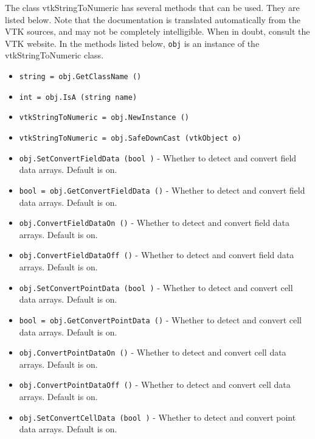The class vtkStringToNumeric has several methods that can be used.
  They are listed below.
Note that the documentation is translated automatically from the VTK sources,
and may not be completely intelligible.  When in doubt, consult the VTK website.
In the methods listed below, \verb|obj| is an instance of the vtkStringToNumeric class.
\begin{itemize}
\item  \verb|string = obj.GetClassName ()|

\item  \verb|int = obj.IsA (string name)|

\item  \verb|vtkStringToNumeric = obj.NewInstance ()|

\item  \verb|vtkStringToNumeric = obj.SafeDownCast (vtkObject o)|

\item  \verb|obj.SetConvertFieldData (bool )| -  Whether to detect and convert field data arrays.  Default is on.

\item  \verb|bool = obj.GetConvertFieldData ()| -  Whether to detect and convert field data arrays.  Default is on.

\item  \verb|obj.ConvertFieldDataOn ()| -  Whether to detect and convert field data arrays.  Default is on.

\item  \verb|obj.ConvertFieldDataOff ()| -  Whether to detect and convert field data arrays.  Default is on.

\item  \verb|obj.SetConvertPointData (bool )| -  Whether to detect and convert cell data arrays.  Default is on.

\item  \verb|bool = obj.GetConvertPointData ()| -  Whether to detect and convert cell data arrays.  Default is on.

\item  \verb|obj.ConvertPointDataOn ()| -  Whether to detect and convert cell data arrays.  Default is on.

\item  \verb|obj.ConvertPointDataOff ()| -  Whether to detect and convert cell data arrays.  Default is on.

\item  \verb|obj.SetConvertCellData (bool )| -  Whether to detect and convert point data arrays.  Default is on.


\end{itemize}
